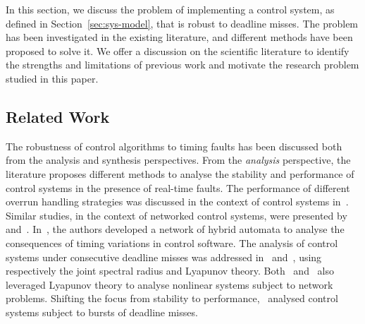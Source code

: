 In this section, we discuss the problem of implementing a control system, as defined in Section~\ref{sec:sys-model}, that is robust to deadline misses.
The problem has been investigated in the existing literature, and different methods have been proposed to solve it.
We offer a discussion on the scientific literature to identify the strengths and limitations of previous work and motivate the research problem studied in this paper.

\subsection{Related Work}
\label{sec:related}
The robustness of control algorithms to timing faults has been discussed both from the analysis and synthesis perspectives.
From the \emph{analysis} perspective, the literature proposes different methods to analyse the stability and performance of control systems in the presence of real-time faults.
The performance of different overrun handling strategies was discussed in the context of control systems in~\cite{Cervin:2005}.
Similar studies, in the context of networked control systems, were presented by~\cite{Schenato:2007} and~\cite{Vreman:2020}.
In~\cite{Frehse:2014}, the authors developed a network of hybrid automata to analyse the consequences of timing variations in control software.
The analysis of control systems under consecutive deadline misses was addressed in~\cite{Maggio:2020} and~\cite{Xiong:2007}, using respectively the joint spectral radius and Lyapunov theory.
Both~\cite{Hertneck:2021} and~\cite{Hertneck:2020} also leveraged Lyapunov theory to analyse nonlinear systems subject to network problems.
Shifting the focus from stability to performance,~\cite{Vreman:2021ecrts} analysed control systems subject to bursts of deadline misses.

